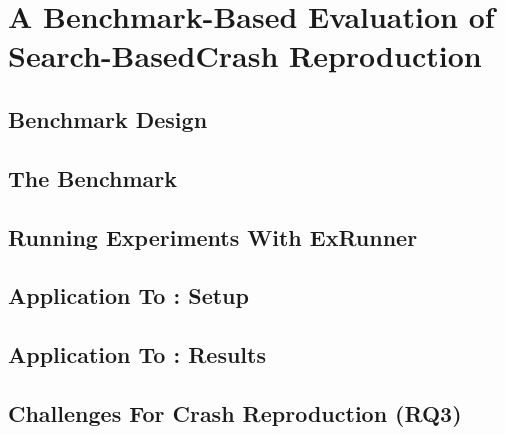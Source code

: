 \chapter{A Benchmark-Based Evaluation of Search-BasedCrash Reproduction}


\label{sec:jcrashpack:introduction}




% 

\section{Benchmark Design}
\label{sec:jcrashpack:benchmarkdesign}


\section{The \crashpack Benchmark}
\label{sec:jcrashpack:benchmark}


\section{Running Experiments With ExRunner}
\label{sec:jcrashpack:ExRunner}


\section{Application To \evocrash: Setup}
\label{sec:jcrashpack:evocrashevalsetup}


\section{Application To \evocrash: Results}
\label{sec:jcrashpack:evocrashevalresults}


\section{Challenges For Crash Reproduction (RQ3)}
\label{sec:jcrashpack:challenges}


